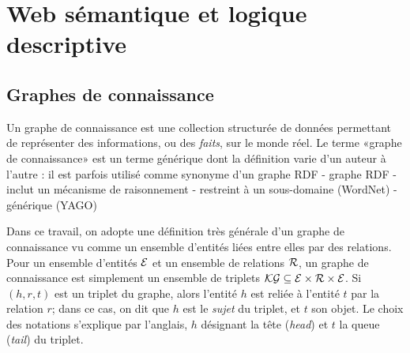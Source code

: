 \label{chap:revue}


\section{Web sémantique et logique descriptive}
\label{sec:dl}

\subsection{Graphes de connaissance}




Un graphe de connaissance est une collection structurée de données permettant de représenter des informations, ou des \textit{faits}, sur le monde réel. Le terme «graphe de connaissance» est un terme générique dont la définition varie d'un auteur à l'autre \cite{ehrlinger2016towards} : il est parfois utilisé comme synonyme d'un graphe RDF
- graphe RDF
- inclut un mécanisme de raisonnement
- restreint à un sous-domaine (WordNet)
- générique (YAGO)


Dans ce travail, on adopte une définition très générale d'un graphe de connaissance vu comme un ensemble d'entités liées entre elles par des relations. Pour un ensemble d'entités $\mathcal{E}$ et un ensemble de relations $\mathcal{R}$, un graphe de connaissance est simplement un ensemble de triplets $\mathcal{KG} \subseteq \mathcal{E} \times \mathcal{R} \times \mathcal{E}$. Si $(h, r, t)$ est un triplet du graphe, alors l'entité $h$ est reliée à l'entité $t$ par la relation $r$; dans ce cas, on dit que $h$ est le \textit{sujet} du triplet, et $t$ son objet. Le choix des notations s'explique par l'anglais, $h$ désignant la tête (\textit{head}) et $t$ la queue (\textit{tail}) du triplet. 

